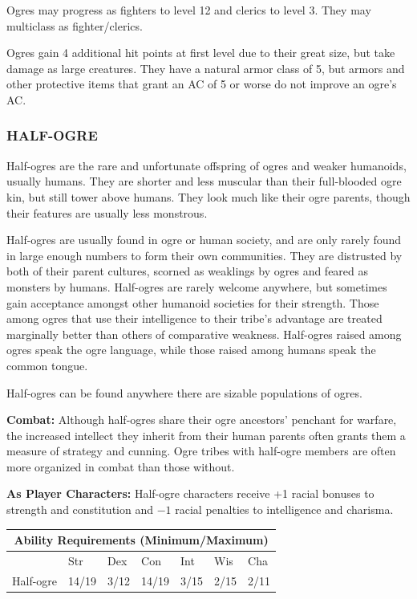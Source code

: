 \begin{multicols}{2}
\begin{minipage}{\columnwidth}
\end{minipage}

Ogres may progress as fighters to level 12 and clerics to level 3. They may multiclass as fighter/clerics.

Ogres gain 4 additional hit points at first level due to their great size, but take damage as large creatures. They have a natural armor class of 5, but armors and other protective items that grant an AC of 5 or worse do not improve an ogre's AC.

\subsubsection{HALF-OGRE}

Half-ogres are the rare and unfortunate offspring of ogres and weaker humanoids, usually humans. They are shorter and less muscular than their full-blooded ogre kin, but still tower above humans. They look much like their ogre parents, though their features are usually less monstrous. 

Half-ogres are usually found in ogre or human society, and are only rarely found in large enough numbers to form their own communities. They are distrusted by both of their parent cultures, scorned as weaklings by ogres and feared as monsters by humans. Half-ogres are rarely welcome anywhere, but sometimes gain acceptance amongst other humanoid societies for their strength. Those among ogres that use their intelligence to their tribe's advantage are treated marginally better than others of comparative weakness. Half-ogres raised among ogres speak the ogre language, while those raised among humans speak the common tongue.

Half-ogres can be found anywhere there are sizable populations of ogres.

\textbf{Combat:} Although half-ogres share their ogre ancestors' penchant for warfare, the increased intellect they inherit from their human parents often grants them a measure of strategy and cunning. Ogre tribes with half-ogre members are often more organized in combat than those without.

\textbf{As Player Characters:} Half-ogre characters receive +1 racial bonuses to strength and constitution and  $-1$ racial penalties to intelligence and charisma.

\noindent \begin{minipage}{\columnwidth}

\noindent \begin{tabular}{|p{}|p{}|p{}|p{}|p{}|p{}|p{}|}
\multicolumn{7}{c}{Ability Requirements (Minimum/Maximum)} \\
\hline
	& Str	& Dex	& Con	& Int	& Wis	& Cha	\\
\hline\hline
\rowcolor[gray]{.9}Half-ogre	& 14/19	& 3/12	& 14/19	& 3/15	& 2/15	& 2/11	\\
\hline
\end{tabular}


\end{minipage}
\end{multicols}
